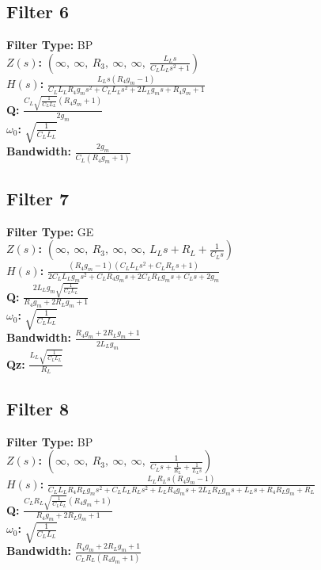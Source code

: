 \documentclass{article}
\begin{document}
\subsection*{Filter 6}
\textbf{Filter Type:} BP \\ 
\textbf{$Z(s)$:} $\left( \infty, \  \infty, \  R_{3}, \  \infty, \  \infty, \  \frac{L_{L} s}{C_{L} L_{L} s^{2} + 1}\right)$ \\ 
\textbf{$H(s)$:} $\frac{L_{L} s \left(R_{4} g_{m} - 1\right)}{C_{L} L_{L} R_{4} g_{m} s^{2} + C_{L} L_{L} s^{2} + 2 L_{L} g_{m} s + R_{4} g_{m} + 1}$ \\ 
\textbf{Q:} $\frac{C_{L} \sqrt{\frac{1}{C_{L} L_{L}}} \left(R_{4} g_{m} + 1\right)}{2 g_{m}}$ \\ 
\textbf{$\omega_0$:} $\sqrt{\frac{1}{C_{L} L_{L}}}$ \\ 
\textbf{Bandwidth:} $\frac{2 g_{m}}{C_{L} \left(R_{4} g_{m} + 1\right)}$ \\ 
\subsection*{Filter 7}
\textbf{Filter Type:} GE \\ 
\textbf{$Z(s)$:} $\left( \infty, \  \infty, \  R_{3}, \  \infty, \  \infty, \  L_{L} s + R_{L} + \frac{1}{C_{L} s}\right)$ \\ 
\textbf{$H(s)$:} $\frac{\left(R_{4} g_{m} - 1\right) \left(C_{L} L_{L} s^{2} + C_{L} R_{L} s + 1\right)}{2 C_{L} L_{L} g_{m} s^{2} + C_{L} R_{4} g_{m} s + 2 C_{L} R_{L} g_{m} s + C_{L} s + 2 g_{m}}$ \\ 
\textbf{Q:} $\frac{2 L_{L} g_{m} \sqrt{\frac{1}{C_{L} L_{L}}}}{R_{4} g_{m} + 2 R_{L} g_{m} + 1}$ \\ 
\textbf{$\omega_0$:} $\sqrt{\frac{1}{C_{L} L_{L}}}$ \\ 
\textbf{Bandwidth:} $\frac{R_{4} g_{m} + 2 R_{L} g_{m} + 1}{2 L_{L} g_{m}}$ \\ 
\textbf{Qz:} $\frac{L_{L} \sqrt{\frac{1}{C_{L} L_{L}}}}{R_{L}}$ \\ 
\subsection*{Filter 8}
\textbf{Filter Type:} BP \\ 
\textbf{$Z(s)$:} $\left( \infty, \  \infty, \  R_{3}, \  \infty, \  \infty, \  \frac{1}{C_{L} s + \frac{1}{R_{L}} + \frac{1}{L_{L} s}}\right)$ \\ 
\textbf{$H(s)$:} $\frac{L_{L} R_{L} s \left(R_{4} g_{m} - 1\right)}{C_{L} L_{L} R_{4} R_{L} g_{m} s^{2} + C_{L} L_{L} R_{L} s^{2} + L_{L} R_{4} g_{m} s + 2 L_{L} R_{L} g_{m} s + L_{L} s + R_{4} R_{L} g_{m} + R_{L}}$ \\ 
\textbf{Q:} $\frac{C_{L} R_{L} \sqrt{\frac{1}{C_{L} L_{L}}} \left(R_{4} g_{m} + 1\right)}{R_{4} g_{m} + 2 R_{L} g_{m} + 1}$ \\ 
\textbf{$\omega_0$:} $\sqrt{\frac{1}{C_{L} L_{L}}}$ \\ 
\textbf{Bandwidth:} $\frac{R_{4} g_{m} + 2 R_{L} g_{m} + 1}{C_{L} R_{L} \left(R_{4} g_{m} + 1\right)}$ \\ 
\end{document}
